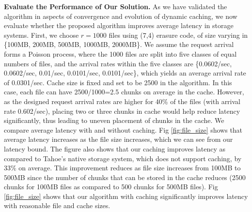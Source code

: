 {\bf Evaluate the Performance of Our Solution.} As we have validated the algorithm in aspects of convergence and evolution of dynamic caching, we now evaluate whether the proposed algorithm improves average latency in storage systems. First, we choose $r=1000$ files using (7,4) erasure code, of size varying in \{100MB, 200MB, 500MB, 1000MB, 2000MB\}. We assume the request arrival forms a Poisson process, where the 1000 files are split into five classes of equal numbers of files, and the arrival rates within the five classes are \{0.0602/sec, 0.0602/sec, 0.01/sec, 0.0101/sec, 0.0101/sec\}, which yields an average arrival rate of 0.0301/sec. Cache size is fixed and set to be 2500 in the algorithm. In this case, each file can have 2500/1000=2.5 chunks on average in the cache. However, as the designed request arrival rates are higher for 40\% of the files (with arrival rate 0.602/sec), placing two or three chunks in cache would help reduce latency significantly, thus leading to uneven placement of chunks in the cache.  We compare average latency with and without caching. Fig \ref{fig:file_size} shows that average latency increases as the file size increases, which we can see from our latency bound. The figure also shows that our caching improves latency as compared to Tahoe's native storage system, which does not support caching, by 33\% on average. This improvement reduces as file size increases from 100MB to 500MB since the number of chunks that can be stored in the cache reduces (2500 chunks for 100MB files as compared to 500 chunks for 500MB files). Fig \ref{fig:file_size} shows that our algorithm with caching significantly improves latency with reasonable file and cache sizes.


